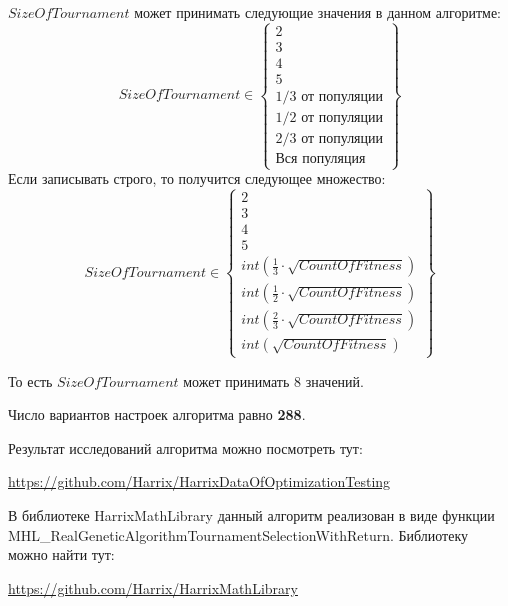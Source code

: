 $SizeOfTournament$ может принимать следующие значения в данном алгоритме:
\begin{equation}
SizeOfTournament \in \begin{Bmatrix}
2\\ 
3\\ 
4\\ 
5\\ 
1/3\text{ от популяции}\\ 
1/2\text{ от популяции}\\ 
2/3\text{ от популяции}\\ 
\text{Вся популяция} 
\end{Bmatrix}
\end{equation}
Если записывать строго, то получится следующее множество:
\begin{equation}
SizeOfTournament \in \begin{Bmatrix}
2\\ 
3\\ 
4\\ 
5\\ 
int\left( \frac{1}{3}\cdot  \sqrt{CountOfFitness}\right)  \\ 
int\left( \frac{1}{2}\cdot  \sqrt{CountOfFitness}\right)\\ 
int\left( \frac{2}{3}\cdot  \sqrt{CountOfFitness}\right)\\ 
int\left( \sqrt{CountOfFitness}\right)
\end{Bmatrix}
\end{equation}

То есть $SizeOfTournament$ может принимать $ 8 $ значений.

Число вариантов настроек алгоритма равно \textbf{288}.

Результат исследований алгоритма можно посмотреть тут:

\href{https://github.com/Harrix/HarrixDataOfOptimizationTesting}{https://github.com/Harrix/HarrixDataOfOptimizationTesting}

В библиотеке HarrixMathLibrary данный алгоритм реализован в виде функции MHL\_RealGeneticAlgorithmTournamentSelectionWithReturn. Библиотеку можно найти тут:

\href{https://github.com/Harrix/HarrixMathLibrary}{https://github.com/Harrix/HarrixMathLibrary}